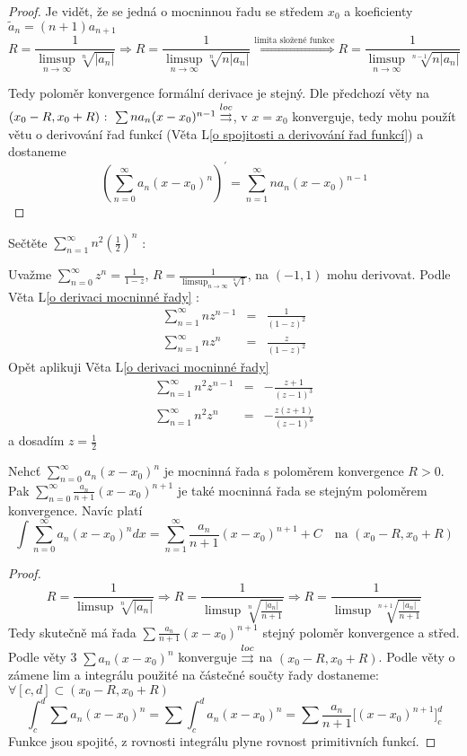 \begin{proof}
Je vidět, že se jedná o mocninnou řadu se středem $x_0$ a koeficienty $\tilde{a}_n = (n+1)a_{n+1}$
$$R = \frac{1}{\limsup_{n \to \infty} \sqrt[n]{|a_n|}} \Rightarrow R = \frac{1}{\limsup_{n \to \infty} \sqrt[n]{n |a_n|}} \overset{\textrm{limita složené funkce}}{\Rightarrow} R = \frac{1}{\limsup_{n \to \infty} \sqrt[n-1]{n |a_n|}}$$

Tedy poloměr konvergence formální derivace je stejný. Dle předchozí věty na $(x_0 - R, x_0 + R) \textrm{ : } \sum n a_n (x-x_0)^{n-1} \overset{loc}{\rightrightarrows}$, v $x=x_0$ konverguje, tedy mohu použít větu o derivování řad funkcí (Věta L\ref{o spojitosti a derivování řad funkcí}) a dostaneme
$$\left( \sum_{n=0}^\infty a_n (x-x_0)^n \right)^\prime = \sum_{n=1}^\infty n a_n (x-x_0)^{n-1}$$
\end{proof}

\begin{priklad}
Sečtěte $\sum_{n=1}^\infty n^2 \left( \frac{1}{2} \right)^n$ :
\end{priklad}

Uvažme $\sum_{n=0}^\infty z^n = \frac{1}{1-z}$, $R = \frac{1}{\limsup_{n \to \infty} \sqrt[n]{1}}$, na $(-1, 1)$ mohu derivovat. Podle Věta L\ref{o derivaci mocninné řady} : 
\begin{eqnarray*}
\sum_{n=1}^\infty n z^{n-1} & = & \frac{1}{(1-z)^2} \\
\sum_{n=1}^\infty n z^n & = & \frac{z}{(1-z)^2}
\end{eqnarray*}
Opět aplikuji Věta L\ref{o derivaci mocninné řady}
\begin{eqnarray*}
\sum_{n=1}^\infty n^2 z^{n-1} & = & - \frac{z+1}{(z-1)^3} \\
\sum_{n=1}^\infty n^2 z^n & = & - \frac{z(z+1)}{(z-1)^3}
\end{eqnarray*}
a dosadím $z = \frac{1}{2}$

\begin{vetal}
Nehcť $\sum_{n=0}^{\infty} a_n (x-x_0)^n$ je mocninná řada s poloměrem konvergence $R > 0$. Pak $\sum_{n=0}^{\infty} \frac{a_n}{n+1} \left(x-x_0 \right)^{n+1}$ je také mocninná řada se stejným poloměrem konvergence. Navíc platí
$$\int \sum_{n=0}^{\infty} a_n (x-x_0)^n dx = \sum_{n=1}^{\infty} \frac{a_n}{n+1} \left( x-x_0 \right)^{n+1} + C  \quad \textrm{na } \left( x_0 - R, x_0 + R \right)$$
\end{vetal}

\begin{proof}
$$R = \frac{1}{\limsup \sqrt[n]{|a_n|}} \Rightarrow R = \frac{1}{\limsup \sqrt[n]{ \frac{|a_n|}{n+1}}} \Rightarrow R = \frac{1}{\limsup \sqrt[n+1]{ \frac {|a_n|}{n+1}}}$$
Tedy skutečně má řada $\sum \frac{a_n}{n+1}(x-x_0)^{n+1}$ stejný poloměr konvergence a střed.
Podle věty 3 $\sum a_n (x-x_0)^n $ konverguje $\overset{loc}{\rightrightarrows}$ na $(x_0-R, x_0+R)$.
Podle věty o zámene lim a integrálu použité na částečné součty řady dostaneme: $\forall [c,d] \subset (x_0-R,x_0+R) $
$$\int_c^d \sum a_n(x-x_0)^n = \sum \int_c^d a_n(x-x_0)^n = \sum \frac{a_n}{n+1} \big[ (x-x_0)^{n+1} \big]_c^d $$
Funkce jsou spojité, z rovnosti integrálu plyne rovnost primitivních funkcí.
\end{proof}

